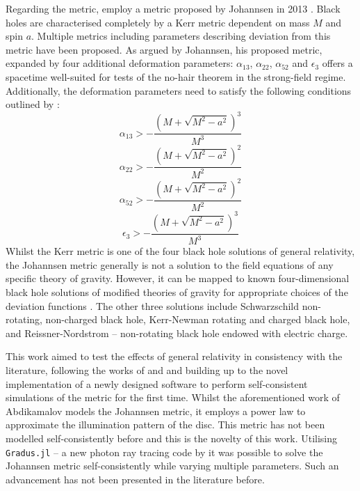 \documentclass[fleqn,usenatbib,useAMS]{mnras}
\begin{document}
Regarding the metric, \cite{abdikamalov2020testing} employ a metric proposed by Johannsen in 2013 \cite{johannsen2013regular}. Black holes are characterised completely by a Kerr metric dependent on mass $M$ and spin $a$. Multiple metrics including parameters describing deviation from this metric have been proposed. As argued by Johannsen, his proposed metric, expanded by four additional deformation parameters: $\alpha_{13}$, $\alpha_{22}$, $\alpha_{52}$ and $\epsilon_{3}$ offers a spacetime well-suited for tests of the no-hair theorem in the strong-field regime. Additionally, the deformation parameters need to satisfy the following conditions outlined by \cite{johannsen2013regular}:
%
\begin{equation}
    \alpha_{13} > - \frac{(M + \sqrt{M^2-a^2})^3}{M^3}
    \label{alpha13}
\end{equation}
%
\begin{equation}
    \alpha_{22} > - \frac{(M + \sqrt{M^2-a^2})^2}{M^2}
    \label{alpha22}
\end{equation}
%
\begin{equation}
    \alpha_{52} > - \frac{(M + \sqrt{M^2-a^2})^2}{M^2}
    \label{alpha52}
\end{equation}
%
\begin{equation}
    \epsilon_{3} > - \frac{(M + \sqrt{M^2-a^2})^3}{M^3}
    \label{epsilon3}
\end{equation}
%
Whilst the Kerr metric is one of the four black hole solutions of general relativity, the Johannsen metric generally is not a solution to the field equations of any specific theory of gravity. However, it can be mapped to known four-dimensional black hole solutions of modified theories of gravity for appropriate choices of the deviation functions \citep{johannsen2013regular}.
The other three solutions include Schwarzschild non-rotating, non-charged black hole, Kerr-Newman rotating and charged black hole, and Reissner-Nordstrom -- non-rotating black hole endowed with electric charge.


This work aimed to test the effects of general relativity in consistency with the literature, following the works of  \cite{abdikamalov2020testing} and \cite{taylor2018exploring} and building up to the novel implementation of a newly designed software to perform self-consistent simulations of the \cite{johannsen2013regular} metric for the first time. Whilst the aforementioned work of Abdikamalov models the Johannsen metric, it employs a power law to approximate the illumination pattern of the disc. This metric has not been modelled self-consistently before and this is the novelty of this work. Utilising {\tt Gradus.jl} -- a new photon ray tracing code by \cite{baker2022} it was possible to solve the Johannsen metric self-consistently while varying multiple parameters. Such an advancement has not been presented in the literature before. 
\end{document}

